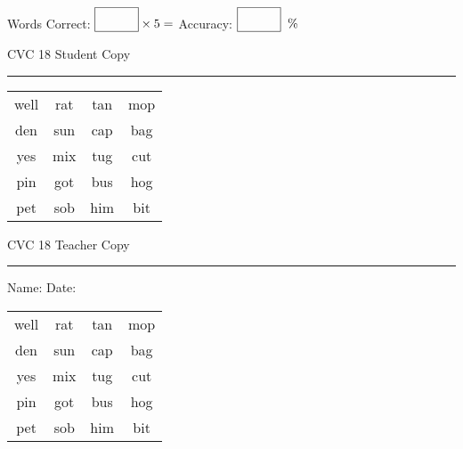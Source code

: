 \documentclass{memoir}
\begin{document}
\small

Words Correct: $\fbox{\phantom{\huge 100}} \times 5 = $ Accuracy: $\fbox{\phantom{\huge 100}}\;\; \%$ 

\vfill

\newpage


\footnotesize \noindent
CVC 18 \hfill Student Copy
\smallskip
\hrule

\Large

\setlength{\tabcolsep}{14pt}
\def\arraystretch{2}

{\selectfont


\begin{vplace}[0.5]
\begin{center}
\begin{tabular}{cccc}
well & rat & tan & mop \\
den & sun & cap & bag \\
yes & mix & tug & cut \\
pin & got & bus & hog \\
pet & sob & him & bit \\
\end{tabular}
\end{center}
\end{vplace}

}

\newpage

\footnotesize \noindent
CVC 18 \hfill Teacher Copy
\smallskip
\hrule

\small

\vfill

\noindent
Name: \underline{\hspace{1.75in}} \hfill Date: \underline{\hspace{1in}}

\Large

{\selectfont


\begin{vplace}[0.5]
\begin{center}
\begin{tabular}{cccc}
well & rat & tan & mop \\
den & sun & cap & bag \\
yes & mix & tug & cut \\
pin & got & bus & hog \\
pet & sob & him & bit \\
\end{tabular}
\end{center}
\end{vplace}



}
\end{document}
